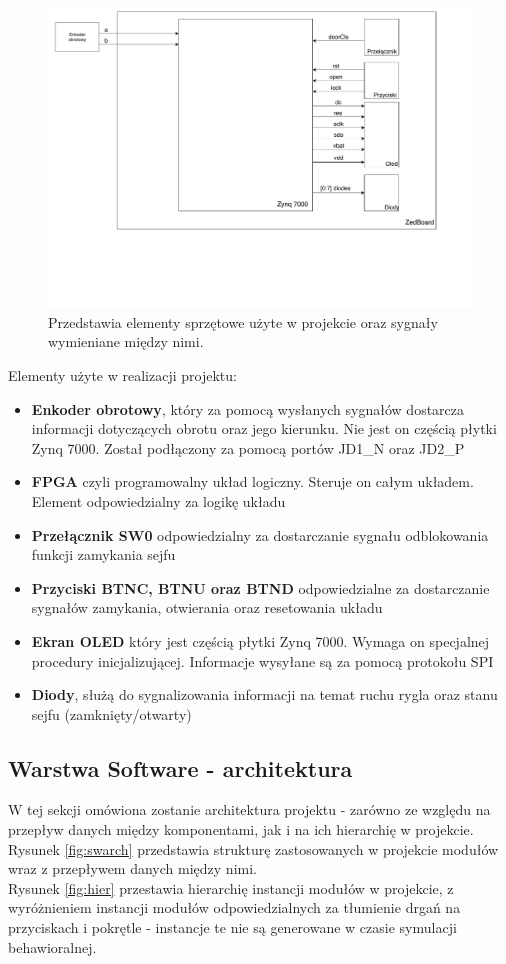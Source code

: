 \documentclass[12pt] {article}
\begin{document}
\begin{figure}[H]
\centering
\includegraphics[width=1.1\textwidth]{res/hardware_architecture.pdf}
\caption{Przedstawia elementy sprzętowe użyte w projekcie oraz sygnały wymieniane między nimi.} 
\end{figure}
\label{fig:hwarch}
\newpage

Elementy użyte w realizacji projektu:
\begin{itemize}
\item \textbf{Enkoder obrotowy}, który za pomocą wysłanych sygnałów dostarcza informacji dotyczących obrotu oraz jego kierunku. Nie jest on częścią płytki Zynq 7000. Został podłączony za pomocą portów JD1\_N oraz JD2\_P
\item \textbf{FPGA} czyli programowalny układ logiczny. Steruje on całym układem. Element odpowiedzialny za logikę układu
\item \textbf{Przełącznik SW0} odpowiedzialny za dostarczanie sygnału odblokowania funkcji zamykania sejfu
\item \textbf{Przyciski BTNC, BTNU oraz BTND} odpowiedzialne za dostarczanie sygnałów zamykania, otwierania oraz resetowania układu
\item \textbf{Ekran OLED} który jest częścią płytki Zynq 7000. Wymaga on specjalnej procedury inicjalizującej. Informacje wysyłane są za pomocą protokołu SPI
\item \textbf{Diody}, służą do sygnalizowania informacji na temat ruchu rygla oraz stanu sejfu (zamknięty/otwarty) 
\end{itemize}

\subsection{Warstwa Software - architektura}
W tej sekcji omówiona zostanie architektura projektu - zarówno ze względu na przepływ danych między komponentami, jak i na ich hierarchię w projekcie. \\
Rysunek \ref{fig:swarch} przedstawia strukturę zastosowanych w projekcie modułów wraz z przepływem danych między nimi. \\
Rysunek \ref{fig:hier} przestawia hierarchię instancji modułów w projekcie, z wyróżnieniem instancji modułów odpowiedzialnych za tłumienie drgań na przyciskach i pokrętle - instancje te nie są generowane w czasie symulacji behawioralnej. 
\end{document}
